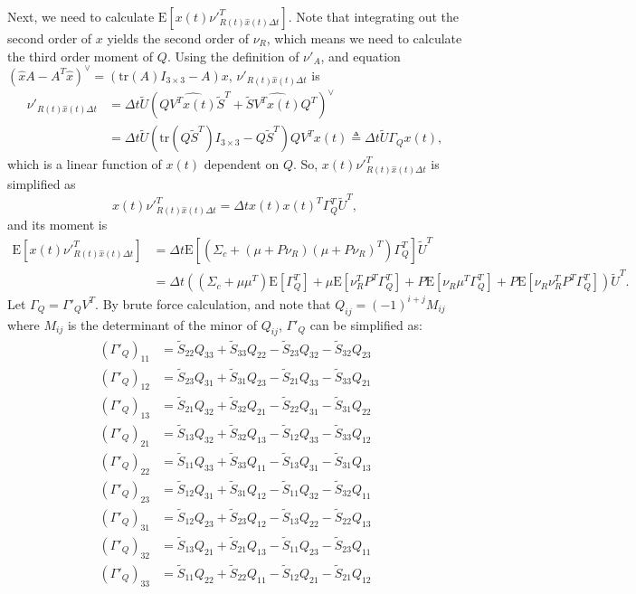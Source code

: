 \documentclass[10pt]{article}
\newcommand{\tr}[1]{\ensuremath{\mathrm{tr}\left( #1 \right)}}
\newcommand{\expect}[1]{\ensuremath{\mathrm{E}\left[ #1 \right]}}
\begin{document}
Next, we need to calculate $\expect{x(t)\nu'^T_{R(t)\hat{x}(t)\Delta t}}$.
Note that integrating out the second order of $x$ yields the second order of $\nu_R$, which means we need to calculate the third order moment of $Q$.
Using the definition of $\nu'_A$, and equation $\left(\hat{x}A-A^T\hat{x}\right)^\vee = \left(\tr{A}I_{3\times 3}-A\right)x$, $\nu'_{R(t)\hat{x}(t)\Delta t}$ is
\begin{align} \label{eqn:vRhatxp}
	\nu'_{R(t)\hat{x}(t)\Delta t} &= \Delta t \tilde{U}\left( Q\widehat{V^Tx(t)}\tilde{S}^T+\tilde{S}\widehat{V^Tx(t)}Q^T \right)^\vee \nonumber \\
	&= \Delta t \tilde{U} \left(\tr{Q\tilde{S}^T}I_{3\times 3}-Q\tilde{S}^T\right)QV^Tx(t) \triangleq \Delta t \tilde{U}\Gamma_Q x(t),
\end{align}
which is a linear function of $x(t)$ dependent on $Q$.
So, $x(t)\nu'^T_{R(t)\hat{x}(t)\Delta t}$ is simplified as
\begin{equation}
x(t)\nu'^T_{R(t)\hat{x}(t)\Delta t} = \Delta t x(t)x(t)^T\Gamma_Q^T\tilde{U}^T,
\end{equation}
and its moment is
\begin{align}
\expect{x(t)\nu'^T_{R(t)\hat{x}(t)\Delta t}} &= \Delta t \expect{\left(\Sigma_c + (\mu+P\nu_R)(\mu+P\nu_R)^T\right) \Gamma_Q^T} \tilde{U}^T \nonumber \\
&= \Delta t \left( (\Sigma_c+\mu\mu^T)\expect{\Gamma_Q^T} +  \mu\expect{\nu_R^TP^T\Gamma_Q^T} +  P\expect{\nu_R\mu^T\Gamma_Q^T} +  P\expect{\nu_R\nu_R^TP^T\Gamma_Q^T} \right) \tilde{U}^T.
\end{align}
Let $\Gamma_Q = \Gamma'_Q V^T$. By brute force calculation, and note that $Q_{ij}=(-1)^{i+j}M_{ij}$ where $M_{ij}$ is the determinant of the minor of $Q_{ij}$, $\Gamma'_Q$ can be simplified as:
\begin{align}
	(\Gamma'_Q)_{11} &= \tilde{S}_{22}Q_{33} + \tilde{S}_{33}Q_{22} - \tilde{S}_{23}Q_{32} - \tilde{S}_{32}Q_{23} \nonumber \\
	(\Gamma'_Q)_{12} &= \tilde{S}_{23}Q_{31} + \tilde{S}_{31}Q_{23} - \tilde{S}_{21}Q_{33} - \tilde{S}_{33}Q_{21} \nonumber \\
	(\Gamma'_Q)_{13} &= \tilde{S}_{21}Q_{32} + \tilde{S}_{32}Q_{21} - \tilde{S}_{22}Q_{31} - \tilde{S}_{31}Q_{22} \nonumber \\
	(\Gamma'_Q)_{21} &= \tilde{S}_{13}Q_{32} + \tilde{S}_{32}Q_{13} - \tilde{S}_{12}Q_{33} - \tilde{S}_{33}Q_{12} \nonumber \\
	(\Gamma'_Q)_{22} &= \tilde{S}_{11}Q_{33} + \tilde{S}_{33}Q_{11} - \tilde{S}_{13}Q_{31} - \tilde{S}_{31}Q_{13} \nonumber \\
	(\Gamma'_Q)_{23} &= \tilde{S}_{12}Q_{31} + \tilde{S}_{31}Q_{12} - \tilde{S}_{11}Q_{32} - \tilde{S}_{32}Q_{11} \nonumber \\
	(\Gamma'_Q)_{31} &= \tilde{S}_{12}Q_{23} + \tilde{S}_{23}Q_{12} - \tilde{S}_{13}Q_{22} - \tilde{S}_{22}Q_{13} \nonumber \\
	(\Gamma'_Q)_{32} &= \tilde{S}_{13}Q_{21} + \tilde{S}_{21}Q_{13} - \tilde{S}_{11}Q_{23} - \tilde{S}_{23}Q_{11} \nonumber \\
	(\Gamma'_Q)_{33} &= \tilde{S}_{11}Q_{22} + \tilde{S}_{22}Q_{11} - \tilde{S}_{12}Q_{21} - \tilde{S}_{21}Q_{12}
\end{align}
\end{document}
